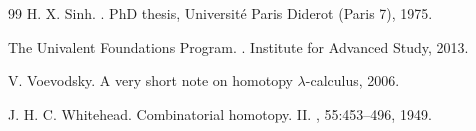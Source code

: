 \documentclass[12pt]{article}
\begin{document}
\begin{thebibliography}{99}
H. X. Sinh.
.
\newblock PhD thesis, Université Paris Diderot (Paris 7), 1975.

The {Univalent Foundations Program}.
.
\newblock Institute for Advanced Study, 2013.

V. Voevodsky.
\newblock A very short note on homotopy $\lambda$-calculus, 2006.

J. H. C. Whitehead.
\newblock Combinatorial homotopy. {II}.
, 55:453--496, 1949.

\end{thebibliography}
\end{document}
